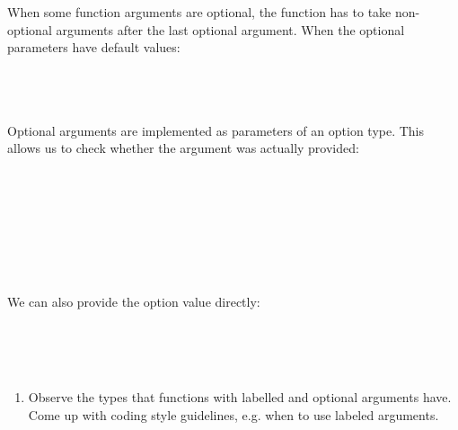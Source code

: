 \documentclass{article}
\begin{document}
\begin{exercise}
  
  When some function arguments are optional, the function has to take
  non-optional arguments after the last optional argument. When the optional
  parameters have default values:
  
  \\
  {}{}{\hlopt{(}}{}{\hlopt{=}}{}{\hlopt{) }}{}{\hlopt{= }}{}{\hlendline{}}\\
  {}{\hlopt{() = }}{}{\hlopt{(}}{}{}{\hlopt{)}}{\hlendline{}}\\
  
  
  Optional arguments are implemented as parameters of an option type. This
  allows us to check whether the argument was actually provided:
  
  \\
  {}{}{\hlopt{=}}{\hlendline{}}\\
  {\hlstd{ \ }}{}{}{}{\hlendline{}}\\
  {\hlstd{ \ \ \ }}{\hlopt{\textbar }}{}{\hlopt{->
  }}{}{}{\hlopt{\textbar }}{}{}{\hlopt{->
  }}{}{}{\hlopt{(}}{}{\hlopt{+ }}{}{\hlopt{)}}{\hlendline{}}\\
  {\hlopt{;;}}{\hlendline{}}\\
  {}{}{\hlopt{;;}}{\hlendline{}}\\
  {}{\hlopt{:}}{}{\hlopt{;;}}{\hlendline{}}\\
  
  
  We can also provide the option value directly:
  
  \\
  {}{}{\hlopt{= }}{}{}{}{}{}{\hlopt{<
  }}{}{}{}{}{}{}{}{\hlendline{}}\\
  {}{}{\hlopt{;;}}{\hlendline{}}\\
  
  \begin{enumerate}
    \item Observe the types that functions with labelled and optional
    arguments have. Come up with coding style guidelines, e.g. when to use
    labeled arguments.
    

\end{enumerate}
\end{exercise}
\end{document}
